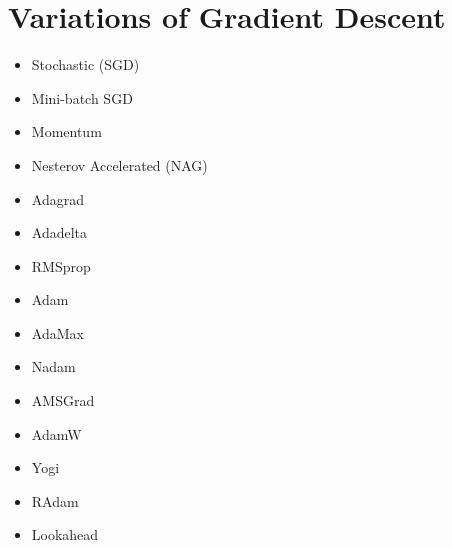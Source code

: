 \documentclass[10pt,twocolumn]{article}
\begin{document}
  \section{Variations of Gradient Descent}
  \begin{itemize}
    \item Stochastic (SGD)
    \item Mini-batch SGD 
    \item Momentum 
    \item Nesterov Accelerated (NAG)
    \item Adagrad
    \item Adadelta
    \item RMSprop
    \item Adam
    \item AdaMax
    \item Nadam
    \item AMSGrad
    \item AdamW
    \item Yogi
    \item RAdam
    \item Lookahead
  \end{itemize}


  
  
% 
\printbibliography

 
\end{document}
